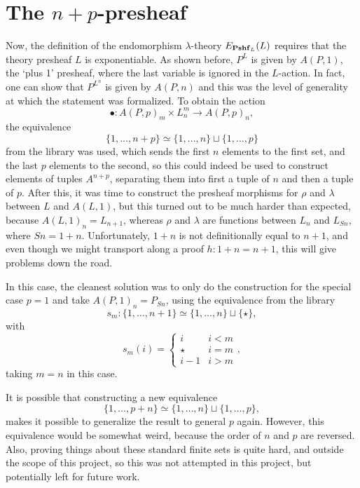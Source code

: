 \section{The \texorpdfstring{$ n + p $}{n + p}-presheaf}
Now, the definition of the endomorphism $ \lambda $-theory $ E_{\mathbf{Pshf}_{L}}(L) $ requires that the theory presheaf $ L $ is exponentiable. As shown before, $ P^L $ is given by $ A(P, 1) $, the `plus 1' presheaf, where the last variable is ignored in the $ L $-action. In fact, one can show that $ P^{L^n} $ is given by $ A(P, n) $ and this was the level of generality at which the statement was formalized. To obtain the action
\[ \bullet : A(P, p)_m \times L_n^m \to A(P, p)_n, \]
the equivalence
\[ \{ 1, \dots, n + p \} \simeq \{ 1, \dots, n \} \sqcup \{ 1, \dots, p \} \]
from the library was used, which sends the first $ n $ elements to the first set, and the last $ p $ elements to the second, so this could indeed be used to construct elements of tuples $ A^{n + p} $, separating them into first a tuple of $ n $ and then a tuple of $ p $. After this, it was time to construct the presheaf morphisms for $ \rho $ and $ \lambda $ between $ L $ and $ A(L, 1) $, but this turned out to be much harder than expected, because $ A(L, 1)_n = L_{n + 1} $, whereas $ \rho $ and $ \lambda $ are functions between $ L_n $ and $ L_{S n} $, where $ S n = 1 + n $. Unfortunately, $ 1 + n $ is not definitionally equal to $ n + 1 $, and even though we might transport along a proof $ h: 1 + n = n + 1 $, this will give problems down the road.

In this case, the cleanest solution was to only do the construction for the special case $ p = 1 $ and take $ A(P, 1)_n = P_{S n} $, using the equivalence from the library
\[ s_m: \{ 1, \dots, n + 1 \} \simeq \{ 1, \dots, n \} \sqcup \{ \star \}, \]
with
\[ s_m(i) = \left\{ \begin{array}{cc}
    i & i < m\\
    \star & i = m\\
    i - 1 & i > m
\end{array}\right. ,  \]
taking $ m = n $ in this case.

It is possible that constructing a new equivalence
\[ \{ 1, \dots, p + n \} \simeq \{1, \dots, n\} \sqcup \{1, \dots, p\}, \]
makes it possible to generalize the result to general $ p $ again. However, this equivalence would be somewhat weird, because the order of $ n $ and $ p $ are reversed. Also, proving things about these standard finite sets is quite hard, and outside the scope of this project, so this was not attempted in this project, but potentially left for future work.

